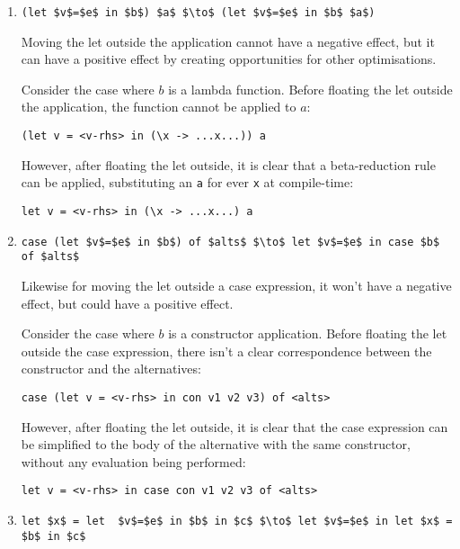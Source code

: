 \begin{enumerate}
\item \lstinline[style=math]{(let $v$=$e$ in $b$) $a$ $\to$ (let $v$=$e$ in $b$ $a$)}

Moving the let outside the application cannot have a negative effect, but it can have a positive effect by creating opportunities for other optimisations.\citep{jones1996}

Consider the case where $b$ is a lambda function. Before floating the let outside the application, the function cannot be applied to $a$:

\begin{lstlisting}
(let v = <v-rhs> in (\x -> ...x...)) a
\end{lstlisting}

However, after floating the let outside, it is clear that a beta-reduction rule can be applied, substituting an \lstinline{a} for ever \lstinline{x} at compile-time:

\begin{lstlisting}
let v = <v-rhs> in (\x -> ...x...) a
\end{lstlisting}

\item \lstinline[style=math]{case (let $v$=$e$ in $b$) of $alts$ $\to$ let $v$=$e$ in case $b$ of $alts$}

Likewise for moving the let outside a case expression, it won't have a negative effect, but could have a positive effect.\citep{jones1996}

Consider the case where $b$ is a constructor application. Before floating the let outside the case expression, there isn't a clear correspondence between the constructor and the alternatives:

\begin{lstlisting}
case (let v = <v-rhs> in con v1 v2 v3) of <alts>
\end{lstlisting}

However, after floating the let outside, it is clear that the case expression can be simplified to the body of the alternative with the same constructor, without any evaluation being performed:

\begin{lstlisting}
let v = <v-rhs> in case con v1 v2 v3 of <alts>
\end{lstlisting}

\item \lstinline[style=math]{let $x$ = let  $v$=$e$ in $b$ in $c$ $\to$ let $v$=$e$ in let $x$ = $b$ in $c$}


\end{enumerate}
